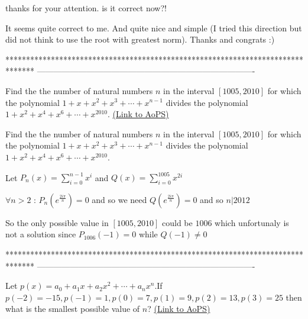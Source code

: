 \begin{solution}
	\begin{tcolorbox} thanks for your attention. is it correct now?!\end{tcolorbox}
It seems quite correct to me.
And quite nice and simple (I tried this direction but did not think to use the root with greatest norm).
Thanks and congrats  :)
\end{solution}
*******************************************************************************
-------------------------------------------------------------------------------

\begin{problem}
	Find the the number of natural numbers $n$ in the interval $[1005,2010]$ for which the polynomial $1+x+x^2+x^3+ \cdots +x^{n-1}$ divides the polynomial $1+x^2+x^4+x^6+ \cdots +x^{2010}$.
	\flushright \href{https://artofproblemsolving.com/community/c6h441891}{(Link to AoPS)}
\end{problem}



\begin{solution}
	\begin{tcolorbox}Find the the number of natural numbers $n$ in the interval $[1005,2010]$ for which the polynomial $1+x+x^2+x^3+ \cdots +x^{n-1}$ divides the polynomial $1+x^2+x^4+x^6+ \cdots +x^{2010}$.\end{tcolorbox}
Let $P_n(x)=\sum_{i=0}^{n-1}x^i$ and $Q(x)=\sum_{i=0}^{1005}x^{2i}$

$\forall n>2$ : $P_n\left(e^{\frac{2i\pi}n}\right)=0$ and so we need $Q\left(e^{\frac{2i\pi}n}\right)=0$ and so $n|2012$

So the only possible value in $[1005,2010]$ could be $1006$ which unfortunaly is not a solution since $P_{1006}(-1)=0$ while $Q(-1)\ne 0$

\end{solution}
*******************************************************************************
-------------------------------------------------------------------------------

\begin{problem}
	Let $p(x)=a_0+a_1x+a_2x^2+ \cdots +a_nx^n$.If $p(-2)=-15,p(-1)=1,p(0)=7,p(1)=9,p(2)=13,p(3)=25$ then what is the smallest possible value of $n$?
	\flushright \href{https://artofproblemsolving.com/community/c6h441942}{(Link to AoPS)}
\end{problem}



